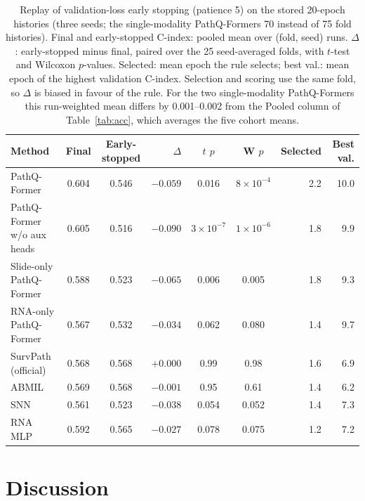 \documentclass{article}
\newcommand{\pq}{PathQ-Former}
\newcommand{\cindex}{C-index}
\begin{document}
\begin{table}[t]
\caption{Replay of validation-loss early stopping (patience 5) on the stored 20-epoch histories (three seeds; the single-modality \pq{}s 70 instead of 75 fold histories). Final and early-stopped \cindex{}: pooled mean over (fold, seed) runs. $\Delta$: early-stopped minus final, paired over the 25 seed-averaged folds, with $t$-test and Wilcoxon $p$-values. Selected: mean epoch the rule selects; best val.: mean epoch of the highest validation \cindex{}. Selection and scoring use the same fold, so $\Delta$ is biased in favour of the rule. For the two single-modality \pq{}s this run-weighted mean differs by 0.001--0.002 from the Pooled column of Table~\ref{tab:acc}, which averages the five cohort means.}
\label{tab:selection}
\centering
\small
\begin{tabular}{@{}lccrccrr@{}}
\toprule
Method & Final & Early-stopped & $\Delta$ & $t$ $p$ & W $p$ & Selected & Best val. \\
\midrule
\pq{} & 0.604 & 0.546 & $-0.059$ & 0.016 & $8\times10^{-4}$ & 2.2 & 10.0 \\
\pq{} w/o aux heads & 0.605 & 0.516 & $-0.090$ & $3\times10^{-7}$ & $1\times10^{-6}$ & 1.8 & 9.9 \\
Slide-only \pq{} & 0.588 & 0.523 & $-0.065$ & 0.006 & 0.005 & 1.8 & 9.3 \\
RNA-only \pq{} & 0.567 & 0.532 & $-0.034$ & 0.062 & 0.080 & 1.4 & 9.7 \\
SurvPath (official) & 0.568 & 0.568 & $+0.000$ & 0.99 & 0.98 & 1.6 & 6.9 \\
ABMIL & 0.569 & 0.568 & $-0.001$ & 0.95 & 0.61 & 1.4 & 6.2 \\
SNN & 0.561 & 0.523 & $-0.038$ & 0.054 & 0.052 & 1.4 & 7.3 \\
RNA MLP & 0.592 & 0.565 & $-0.027$ & 0.078 & 0.075 & 1.2 & 7.2 \\
\bottomrule
\end{tabular}
\end{table}

\section{Discussion}
\label{sec:discussion}
\end{document}
